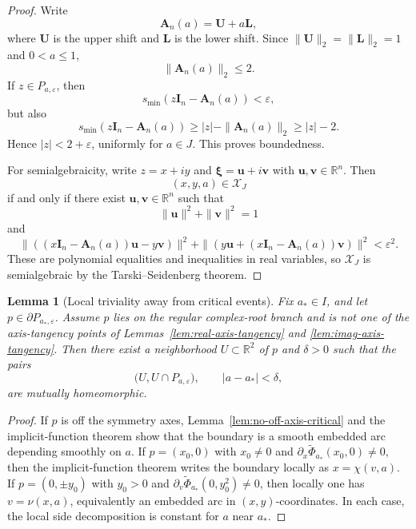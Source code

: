 \documentclass[11pt]{article}
\newtheorem{lemma}[theorem]{Lemma}
\newcommand{\R}{\mathbb{R}}
\begin{document}
\begin{proof}
Write
\[
\mathbf A_n(a)=\mathbf U+a\mathbf L,
\]
where \(\mathbf U\) is the upper shift and \(\mathbf L\) is the lower shift. Since \(\|\mathbf U\|_2=\|\mathbf L\|_2=1\) and \(0<a\le 1\),
\[
\|\mathbf A_n(a)\|_2\le 2.
\]
If \(z\in P_{a,\varepsilon}\), then
\[
s_{\min}(z\mathbf I_n-\mathbf A_n(a))<\varepsilon,
\]
but also
\[
s_{\min}(z\mathbf I_n-\mathbf A_n(a))
\ge |z|-\|\mathbf A_n(a)\|_2
\ge |z|-2.
\]
Hence \(|z|<2+\varepsilon\), uniformly for \(a\in J\). This proves boundedness.

For semialgebraicity, write \(z=x+iy\) and \(\boldsymbol\xi=\mathbf u+i\mathbf v\) with \(\mathbf u,\mathbf v\in\R^n\). Then
\[
(x,y,a)\in \mathcal X_J
\]
if and only if there exist \(\mathbf u,\mathbf v\in\R^n\) such that
\[
\|\mathbf u\|^2+\|\mathbf v\|^2=1
\]
and
\[
\|((x\mathbf I_n-\mathbf A_n(a))\mathbf u-y\mathbf v)\|^2
+
\|(y\mathbf u+(x\mathbf I_n-\mathbf A_n(a))\mathbf v)\|^2
<\varepsilon^2.
\]
These are polynomial equalities and inequalities in real variables, so \(\mathcal X_J\) is semialgebraic by the Tarski--Seidenberg theorem.
\end{proof}

\begin{lemma}[Local triviality away from critical events]\label{lem:local-trivial}
Fix \(a_*\in I\), and let \(p\in \partial P_{a_*,\varepsilon}\). Assume \(p\) lies on the regular complex-root branch and is not one of the axis-tangency points of Lemmas~\ref{lem:real-axis-tangency} and \ref{lem:imag-axis-tangency}. Then there exist a neighborhood \(U\subset\R^2\) of \(p\) and \(\delta>0\) such that the pairs
\[
\bigl(U,U\cap P_{a,\varepsilon}\bigr),
\qquad
|a-a_*|<\delta,
\]
are mutually homeomorphic.
\end{lemma}

\begin{proof}
If \(p\) is off the symmetry axes, Lemma~\ref{lem:no-off-axis-critical} and the implicit-function theorem show that the boundary is a smooth embedded arc depending smoothly on \(a\). If \(p=(x_0,0)\) with \(x_0\neq 0\) and \(\partial_x\widetilde\Phi_{a_*}(x_0,0)\neq 0\), then the implicit-function theorem writes the boundary locally as \(x=\chi(v,a)\). If \(p=(0,\pm y_0)\) with \(y_0>0\) and \(\partial_v\widetilde\Phi_{a_*}(0,y_0^2)\neq 0\), then locally one has \(v=\nu(x,a)\), equivalently an embedded arc in \((x,y)\)-coordinates. In each case, the local side decomposition is constant for \(a\) near \(a_*\).
\end{proof}
\end{document}
